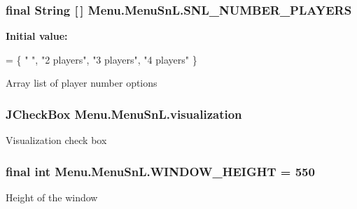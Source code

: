 \subsubsection[{S\+N\+L\+\_\+\+N\+U\+M\+B\+E\+R\+\_\+\+P\+L\+A\+Y\+E\+R\+S}]{\setlength{\rightskip}{0pt plus 5cm}final String \mbox{[}$\,$\mbox{]} Menu.\+Menu\+Sn\+L.\+S\+N\+L\+\_\+\+N\+U\+M\+B\+E\+R\+\_\+\+P\+L\+A\+Y\+E\+R\+S\hspace{0.3cm}{\ttfamily [private]}}\label{class_menu_1_1_menu_sn_l_accdb88464884a651bab3a9ebb5eb2beb}
{\bfseries Initial value\+:}
\begin{DoxyCode}
= \{ \textcolor{stringliteral}{" "}, \textcolor{stringliteral}{"2 players"},
            \textcolor{stringliteral}{"3 players"}, \textcolor{stringliteral}{"4 players"} \}
\end{DoxyCode}
Array list of player number options \hypertarget{class_menu_1_1_menu_sn_l_a774bdc16dab9d1c0c882d2212beb70ac}{}
\subsubsection[{visualization}]{\setlength{\rightskip}{0pt plus 5cm}J\+Check\+Box Menu.\+Menu\+Sn\+L.\+visualization\hspace{0.3cm}{\ttfamily [private]}}\label{class_menu_1_1_menu_sn_l_a774bdc16dab9d1c0c882d2212beb70ac}
Visualization check box \hypertarget{class_menu_1_1_menu_sn_l_a32c2e05c64b453df29d8b6df1061a939}{}
\subsubsection[{W\+I\+N\+D\+O\+W\+\_\+\+H\+E\+I\+G\+H\+T}]{\setlength{\rightskip}{0pt plus 5cm}final int Menu.\+Menu\+Sn\+L.\+W\+I\+N\+D\+O\+W\+\_\+\+H\+E\+I\+G\+H\+T = 550\hspace{0.3cm}{\ttfamily [private]}}\label{class_menu_1_1_menu_sn_l_a32c2e05c64b453df29d8b6df1061a939}
Height of the window \hypertarget{class_menu_1_1_menu_sn_l_a62bbb19bbedcdf63b575b4ae1048c343}{}
